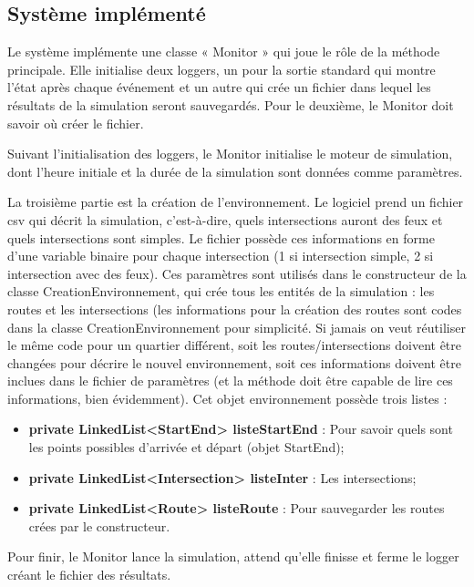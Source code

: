 \documentclass[12pt]{article} %
\begin{document}
\subsection{Système implémenté}
Le système implémente une classe « Monitor » qui joue le rôle de la méthode principale. Elle initialise deux loggers, un pour la sortie standard qui montre l'état après chaque événement et un autre qui crée un fichier dans lequel les résultats de la simulation seront sauvegardés. Pour le deuxième, le Monitor doit savoir où créer le fichier.

Suivant l'initialisation des loggers, le Monitor initialise le moteur de simulation, dont l'heure initiale et la durée de la simulation sont données comme paramètres. 

La troisième partie est la création de l'environnement. Le logiciel prend un fichier csv qui décrit la simulation, c'est-à-dire, quels intersections auront des feux et quels intersections sont simples. Le fichier possède ces informations en forme d'une variable binaire pour chaque intersection (1 si intersection simple, 2 si intersection avec des feux).
%
Ces paramètres sont utilisés dans le constructeur de la classe CreationEnvironnement, qui crée tous les entités de la simulation : les routes et les intersections (les informations pour la création des routes sont codes dans la classe CreationEnvironnement pour simplicité. Si jamais on veut réutiliser le même code pour un quartier différent, soit les routes/intersections doivent être changées pour décrire le nouvel environnement, soit ces informations doivent être inclues dans le fichier de paramètres (et la méthode doit être capable de lire ces informations, bien évidemment).
%
Cet objet environnement possède trois listes :
\begin{itemize}
\item \textbf{private LinkedList<StartEnd> listeStartEnd} : Pour savoir quels sont les points possibles d'arrivée et départ (objet StartEnd);

\item \textbf{private LinkedList<Intersection> listeInter} : Les intersections;

\item \textbf{private LinkedList<Route> listeRoute} : Pour sauvegarder les routes crées par le constructeur.
\end{itemize}

Pour finir, le Monitor lance la simulation, attend qu'elle finisse et ferme le logger créant le fichier des résultats.
\end{document}
